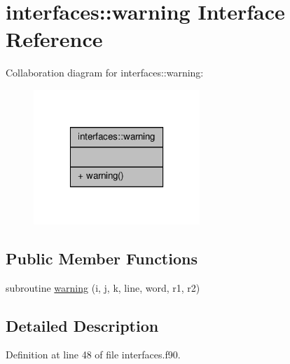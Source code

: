 \hypertarget{interfaceinterfaces_1_1warning}{\section{interfaces\-:\-:warning Interface Reference}
\label{interfaceinterfaces_1_1warning}
}


Collaboration diagram for interfaces\-:\-:warning\-:\nopagebreak
\begin{figure}[H]
\begin{center}
\leavevmode
\includegraphics[width=178pt]{interfaceinterfaces_1_1warning__coll__graph}
\end{center}
\end{figure}
\subsection*{Public Member Functions}
\begin{DoxyCompactItemize}
\item 
subroutine \hyperlink{interfaceinterfaces_1_1warning_a167b4a1eeeff911a881c3159e243147d}{warning} (i, j, k, line, word, r1, r2)
\end{DoxyCompactItemize}


\subsection{Detailed Description}


Definition at line 48 of file interfaces.\-f90.



